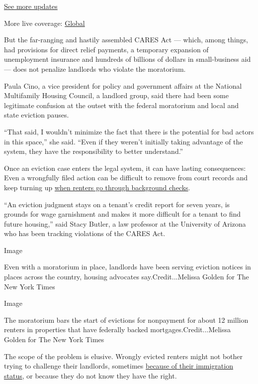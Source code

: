 \href{https://www.nytimes.com/live/2020/08/07/business/stock-market-today-coronavirus?action=click\&pgtype=Article\&state=default\&region=MAIN_CONTENT_1\&context=storylines_live_updates}{See
more updates}

More live coverage:
\href{https://www.nytimes.com/2020/08/07/world/covid-19-news.html?action=click\&pgtype=Article\&state=default\&region=MAIN_CONTENT_1\&context=storylines_live_updates}{Global}

But the far-ranging and hastily assembled CARES Act --- which, among
things, had provisions for direct relief payments, a temporary expansion
of unemployment insurance and hundreds of billions of dollars in
small-business aid --- does not penalize landlords who violate the
moratorium.

Paula Cino, a vice president for policy and government affairs at the
National Multifamily Housing Council, a landlord group, said there had
been some legitimate confusion at the outset with the federal moratorium
and local and state eviction pauses.

``That said, I wouldn't minimize the fact that there is the potential
for bad actors in this space,'' she said. ``Even if they weren't
initially taking advantage of the system, they have the responsibility
to better understand.''

Once an eviction case enters the legal system, it can have lasting
consequences: Even a wrongfully filed action can be difficult to remove
from court records and keep turning up
\href{https://www.nytimes.com/2020/05/28/business/renters-background-checks.html}{when
renters go through background checks}.

``An eviction judgment stays on a tenant's credit report for seven
years, is grounds for wage garnishment and makes it more difficult for a
tenant to find future housing,'' said Stacy Butler, a law professor at
the University of Arizona who has been tracking violations of the CARES
Act.

Image

Even with a moratorium in place, landlords have been serving eviction
notices in places across the country, housing advocates
say.Credit...Melissa Golden for The New York Times

Image

The moratorium bars the start of evictions for nonpayment for about 12
million renters in properties that have federally backed
mortgages.Credit...Melissa Golden for The New York Times

The scope of the problem is elusive. Wrongly evicted renters might not
bother trying to challenge their landlords, sometimes
\href{https://www.nytimes.com/2020/07/04/us/coronavirus-evictions-renters-immigrants.html}{because
of their immigration status}, or because they do not know they have the
right.

